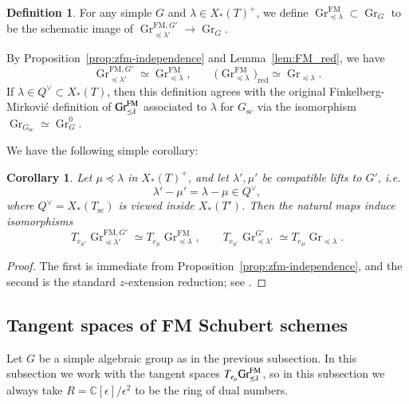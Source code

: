 \documentclass[a4paper, 12pt]{amsart}
\newtheorem{corollary}[theorem]{Corollary}
\theoremstyle{definition}
\newtheorem{definition}[theorem]{Definition}
\DeclareMathOperator{\Gr}{\mathrm{Gr}}
\begin{document}
\begin{definition}
For any simple $G$ and $\lambda\in X_*(T)^+$, we define
$\Gr^{\mathrm{FM}}_{\preceq\lambda}\subset\Gr_G$ to be the schematic
image of
$\Gr^{\mathrm{FM},G'}_{\preceq\lambda'}\to\Gr_G$.  
\end{definition}
By Proposition~\ref{prop:zfm-independence} and Lemma~\ref{lem:FM_red}, we have
\begin{equation}\label{eq:zfm-scheme-comparison}
\Gr^{\mathrm{FM},G'}_{\preceq\lambda'}
\simeq  \Gr^{\mathrm{FM}}_{\preceq\lambda},
\qquad
\bigl(\Gr^{\mathrm{FM}}_{\preceq\lambda}\bigr)_{\mathrm{red}}
\simeq \Gr_{\preceq\lambda}.
\end{equation}
If $\lambda\in Q^\vee\subset X_*(T)$, then this definition agrees with the original Finkelberg-Mirkovi\'c definition of $\Gr_{\preceq \lambda}^{\rm{FM}}$ associated to $\lambda$ for $G_{\mathrm{sc}}$  via the isomorphism
$\Gr_{G_{\mathrm{sc}}}\simeq\Gr_G^0$.

We have the following simple corollary:
\begin{corollary}\label{cor:zfm-tangent}
Let $\mu \preceq \lambda$ in $X_*(T)^+$, and let $\lambda',\mu'$ be
compatible lifts to $G'$, i.e.
\begin{equation}\label{eq:zfm-compatible-lift}
\lambda'-\mu'=\lambda-\mu\in Q^\vee,
\end{equation}
where $Q^\vee=X_*(T_{\mathrm{sc}})$ is viewed inside $X_*(T')$.
 Then the natural maps induce isomorphisms
\[
T_{e_{\mu'}}
\Gr_{\preceq \lambda'}^{\mathrm{FM},G'}
\simeq
T_{e_\mu}
\Gr_{\preceq \lambda}^{\mathrm{FM}},
\qquad
T_{e_{\mu'}}
\Gr_{\preceq \lambda'}^{G'}
\simeq
T_{e_\mu}
\Gr_{\preceq \lambda}.
\]
\end{corollary}

\begin{proof}
The first is immediate from Proposition~\ref{prop:zfm-independence}, and
the second is the standard $z$-extension reduction; see
\cite[\S4.2.4]{KPZ}.
\end{proof}



\subsection{Tangent spaces of FM Schubert schemes} 
\label{subsec:fm-tangents}
Let $G$ be a simple algebraic group as in the previous subsection. In this subsection we work with the tangent spaces $T_{e_{\mu}}\rm{Gr}_{\preceq \lambda}^{\rm{FM}}$, so in this subsection we always take $R= \mathbb{C}[\epsilon]/\epsilon^2$ to be the ring of dual numbers.
\end{document}
